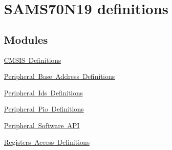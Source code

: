 \hypertarget{group__SAMS70N19__definitions}{}\section{S\+A\+M\+S70\+N19 definitions}
\label{group__SAMS70N19__definitions}
\subsection*{Modules}
\begin{DoxyCompactItemize}
\item 
\mbox{\hyperlink{group__SAMS70N19__cmsis}{C\+M\+S\+I\+S Definitions}}
\item 
\mbox{\hyperlink{group__SAMS70N19__base}{Peripheral Base Address Definitions}}
\item 
\mbox{\hyperlink{group__SAMS70N19__id}{Peripheral Ids Definitions}}
\item 
\mbox{\hyperlink{group__SAMS70N19__pio}{Peripheral Pio Definitions}}
\item 
\mbox{\hyperlink{group__SAMS70N19__api}{Peripheral Software A\+PI}}
\item 
\mbox{\hyperlink{group__SAMS70N19__reg}{Registers Access Definitions}}
\end{DoxyCompactItemize}
